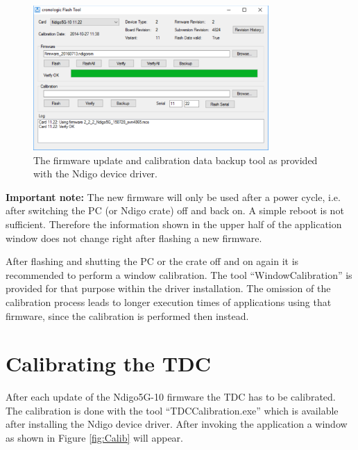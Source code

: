 		\begin{figure}[ht]
			\begin{center}
				\includegraphics[width=0.8\textwidth]{figures/Firmware.pdf}
				\caption{\label{fig:Firmware}The firmware update and calibration data backup tool as provided with the Ndigo device driver.}
			\end{center}
		\end{figure}

\textbf{Important note:} The new firmware will only be used after a power cycle, i.e. after switching the PC (or Ndigo crate) off and back on. A simple reboot is not sufficient. Therefore the information shown in the upper half of the application window does not change right after flashing a new firmware.\par
After flashing and shutting the PC or the crate off and on again it is recommended to perform a window calibration. The tool ``WindowCalibration'' is provided for that purpose within the driver installation. The omission of the calibration process leads to longer execution times of applications using that firmware, since the calibration is performed then instead.
	
	\section{Calibrating the TDC}
	
		After each update of the Ndigo5G-10 firmware the TDC has to be calibrated. The calibration is done with the tool ``TDC\textunderscore Calibration.exe'' which is available after installing the Ndigo device driver. After invoking the application a window as shown in Figure \ref{fig:Calib} will appear.\par

